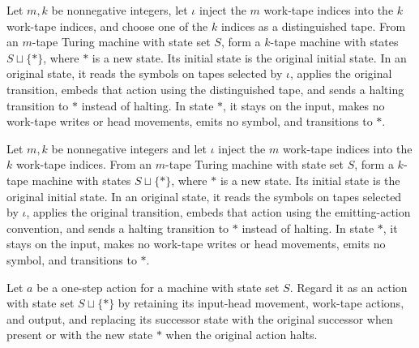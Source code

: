 \begin{definition}
\label{Turing.embedSilentRetTM}
\leanok
{}
Let $m,k$ be nonnegative integers, let $\iota$ inject the $m$ work-tape indices into the
$k$ work-tape indices, and choose one of the $k$ indices as a distinguished tape. From
an $m$-tape Turing machine with state set $S$, form a $k$-tape machine with states
$S\sqcup\{\ast\}$, where $\ast$ is a new state. Its initial state is the original
initial state. In an original state, it reads the symbols on tapes selected by $\iota$,
applies the original transition, embeds that action using the distinguished tape, and
sends a halting transition to $\ast$ instead of halting. In state $\ast$, it stays on
the input, makes no work-tape writes or head movements, emits no symbol, and transitions
to $\ast$.
\end{definition}

\begin{definition}
\label{Turing.embedEmitRetTM}
\leanok
{}
Let $m,k$ be nonnegative integers and let $\iota$ inject the $m$ work-tape indices into
the $k$ work-tape indices. From an $m$-tape Turing machine with state set $S$, form a
$k$-tape machine with states $S\sqcup\{\ast\}$, where $\ast$ is a new state. Its initial
state is the original initial state. In an original state, it reads the symbols on tapes
selected by $\iota$, applies the original transition, embeds that action using the
emitting-action convention, and sends a halting transition to $\ast$ instead of halting.
In state $\ast$, it stays on the input, makes no work-tape writes or head movements,
emits no symbol, and transitions to $\ast$.
\end{definition}

\begin{definition}
\label{Turing.embedReturnAction}
\leanok
{}
Let $a$ be a one-step action for a machine with state set $S$. Regard it as an action
with state set $S\sqcup\{\ast\}$ by retaining its input-head movement, work-tape
actions, and output, and replacing its successor state with the original successor when
present or with the new state $\ast$ when the original action halts.
\end{definition}

